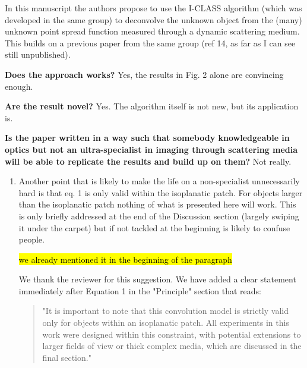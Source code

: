 \documentclass[12pt]{article}
\newcommand{\hlred}[1]{\sethlcolor{red!30}\hl{#1}}
\newenvironment{reviewercomment}
    {\begin{tcolorbox}[width=\linewidth,colback=gray!5,colframe=commentcolor!50,title=Reviewer Comment,left=5pt,right=5pt]}
    {\end{tcolorbox}}
\newenvironment{solved_reviewercomment}
    {\begin{tcolorbox}[width=\linewidth,colback=gray!5,colframe=solved_commentcolor!50,title=Reviewer Comment,left=5pt,right=5pt]}
    {\end{tcolorbox}}
\newenvironment{ourresponse}
    {\begin{tcolorbox}[width=\linewidth,breakable,enhanced,colback=gray!5,colframe=responsecolor!50,title=Response,left=5pt,right=5pt]}
    {\end{tcolorbox}}
\begin{document}
In this manuscript the authors propose to use the I-CLASS algorithm (which was developed in the same group) to deconvolve the unknown object from the (many) unknown point spread function measured through a dynamic scattering medium. This builds on a previous paper from the same group (ref 14, as far as I can see still unpublished).

\textbf{Does the approach works?} Yes, the results in Fig. 2 alone are convincing enough.

\textbf{Are the result novel?} Yes. The algorithm itself is not new, but its application is.

\textbf{Is the paper written in a way such that somebody knowledgeable in optics but not an ultra-specialist in imaging through scattering media will be able to replicate the results and build up on them?} Not really. 
\begin{enumerate}[label=\arabic*.]

    \begin{reviewercomment}
        The main culprit is that the whole CRT-CLASS/I-CLASS are not well-known algorithms, and the only reference given to readers to make themselves familiar with them is not self-contained. \textbf{This has a very easy fix:} add a section in the supplementary information with an explanation of how and why the algorithm works (there is no space restriction there, so there is also no excuse to provide the necessary information).
    \end{reviewercomment}
    \begin{ourresponse}
        \textbf{[Benzy initial]:}
        SABABA
    \end{ourresponse}

    \item \leavevmode\vspace{-\baselineskip}
    \begin{solved_reviewercomment}
        Another point that is likely to make the life on a non-specialist unnecessarily hard is that eq. 1 is only valid within the isoplanatic patch. For objects larger than the isoplanatic patch nothing of what is presented here will work. This is only briefly addressed at the end of the Discussion section (largely swiping it under the carpet) but if not tackled at the beginning is likely to confuse people.
        
        \hlred{we already mentioned it in the beginning of the paragraph}

    \end{solved_reviewercomment}
    \begin{ourresponse}
        We thank the reviewer for this suggestion. 
        We have added a clear statement immediately after Equation 1 in the "Principle" section that reads:
        \begin{quote}
            "It is important to note that this convolution model is strictly valid only for objects within an isoplanatic patch. All experiments in this work were designed within this constraint, with potential extensions to larger fields of view or thick complex media, which are discussed in the final section."
        \end{quote}
        

\end{ourresponse}
\end{enumerate}
\end{document}
